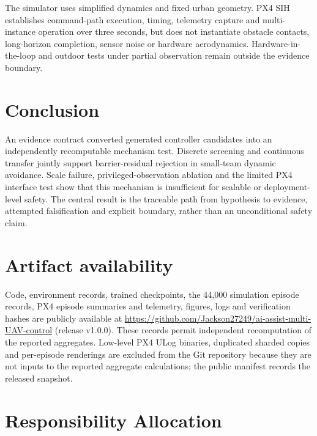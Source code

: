 \documentclass{article}
\begin{document}
The simulator uses simplified dynamics and fixed urban geometry. PX4 SIH establishes command-path execution, timing, telemetry capture and multi-instance operation over three seconds, but does not instantiate obstacle contacts, long-horizon completion, sensor noise or hardware aerodynamics. Hardware-in-the-loop and outdoor tests under partial observation remain outside the evidence boundary.

\section{Conclusion}

An evidence contract converted generated controller candidates into an independently recomputable mechanism test. Discrete screening and continuous transfer jointly support barrier-residual rejection in small-team dynamic avoidance. Scale failure, privileged-observation ablation and the limited PX4 interface test show that this mechanism is insufficient for scalable or deployment-level safety. The central result is the traceable path from hypothesis to evidence, attempted falsification and explicit boundary, rather than an unconditional safety claim.




\clearpage
\appendix
\raggedbottom
\section{Artifact availability}

Code, environment records, trained checkpoints, the 44,000 simulation episode records, PX4 episode summaries and telemetry, figures, logs and verification hashes are publicly available at \url{https://github.com/Jackson27249/ai-assist-multi-UAV-control} (release v1.0.0). These records permit independent recomputation of the reported aggregates. Low-level PX4 ULog binaries, duplicated sharded copies and per-episode renderings are excluded from the Git repository because they are not inputs to the reported aggregate calculations; the public manifest records the released snapshot.

\section{Responsibility Allocation}
\end{document}
